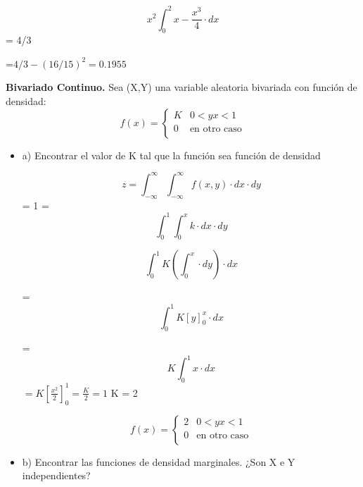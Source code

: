 \documentclass{../oxmathproblems}
\begin{document}
\begin{questions}
\begin{itemize}

\begin{equation}
 x^2 \int_{0}^{2} x- \frac{x^3}{4} \cdot dx
\end{equation} 
= 4/3


=$  4/3 - (16/15)^2 = 0.1955 $
\end{itemize}

\miquestion \textbf {Bivariado Continuo. } Sea (X,Y) una variable aleatoria bivariada con función de densidad: 
\[ 
f(x) = 
     \begin{cases}
        K  & 0  < {y}   
        {x} < 1 \\
       0 & \text{en otro caso} \\
     \end{cases}
\]


\begin{itemize}
\item  a) Encontrar el valor de K tal que la función sea función de densidad 

\begin{equation}
z = \int _{-\infty}^{\infty} \int _{-\infty}^{\infty} f(x,y) \cdot dx \cdot dy
\end{equation} 
= 1 
= 
 \begin{equation}
 \int _{0}^{1} \int _{0}^{x} k \cdot dx \cdot dy
\end{equation}


 \begin{equation}
 \int _{0}^{1} K (\int _{0}^{x}  \cdot dy) \cdot dx
\end{equation} 

= \begin{equation}
 \int _{0}^{1} K [y]^x_0 \cdot dx
\end{equation} 

= 
\begin{equation}
K \int _{0}^{1}  x \cdot dx
\end{equation}
$
= K [\frac{x^2}{2}]^1_0 
= \frac{K}{2} = 1
$
K = 2

\[ 
f(x) = 
     \begin{cases}
        2  & 0  < {y}   
        {x} < 1 \\
       0 & \text{en otro caso} \\
     \end{cases}
\]

\item  b) Encontrar las funciones de densidad marginales. ¿Son X e Y independientes?


\end{itemize}
\end{questions}
\end{document}
